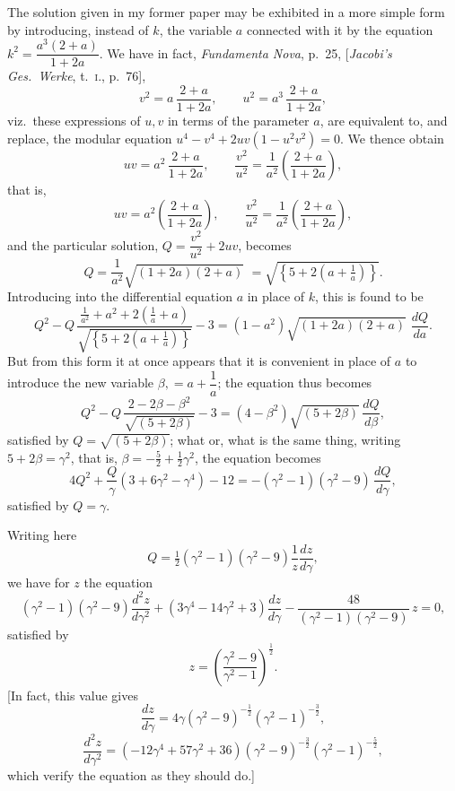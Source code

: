 \documentclass[11pt]{article}
\begin{document}
\medskip
The solution given in my former paper may be exhibited in a more simple form by
introducing, instead of $k$, the variable $a$ connected with it by the equation
$k^{2}=\dfrac{a^{3}(2+a)}{1+2a}$. We have in fact, \textit{Fundamenta Nova}, p.\ 25, [\textit{Jacobi's Ges.\
Werke}, t.\ \textsc{i}., p.\ 76],
\[
v^{2}=a\,\frac{2+a}{1+2a},\qquad u^{2}=a^{3}\,\frac{2+a}{1+2a},
\]
viz.\ these expressions of $u,v$ in terms of the parameter $a$, are equivalent to, and
replace, the modular equation $u^{4}-v^{4}+2uv(1-u^{2}v^{2})=0$. We thence obtain
\[
uv=a^{2}\,\frac{2+a}{1+2a},\qquad \frac{v^{2}}{u^{2}}=\frac{1}{a^{2}}\!\left(\frac{2+a}{1+2a}\right),
\]
that is,
\[
uv=a^{2}\!\left(\frac{2+a}{1+2a}\right),\qquad \frac{v^{2}}{u^{2}}=\frac{1}{a^{2}}\!\left(\frac{2+a}{1+2a}\right),
\]
and the particular solution, $Q=\dfrac{v^{2}}{u^{2}}+2uv$, becomes
\[
Q=\frac{1}{a^{2}}\sqrt{(1+2a)(2+a)}\,\,=\sqrt{\!\left\{5+2\!\left(a+\tfrac{1}{a}\right)\right\}}.
\]
Introducing into the differential equation $a$ in place of $k$, this is found to be
\[
Q^{2}-Q\,\frac{\tfrac{1}{a^{2}}+a^{2}+2\!\left(\tfrac{1}{a}+a\right)}{\sqrt{\!\left\{5+2\!\left(a+\tfrac{1}{a}\right)\right\}}}-3=(1-a^{2})\sqrt{(1+2a)(2+a)}\,\,\frac{dQ}{da}.
\]
But from this form it at once appears that it is convenient in place of $a$ to introduce
the new variable $\beta,=a+\dfrac{1}{a}$; the equation thus becomes
\[
Q^{2}-Q\,\frac{2-2\beta-\beta^{2}}{\sqrt{(5+2\beta)}}-3=(4-\beta^{2})\sqrt{(5+2\beta)}\,\frac{dQ}{d\beta},
\]
satisfied by $Q=\sqrt{(5+2\beta)}$; what or, what is the same thing, writing
$5+2\beta=\gamma^{2}$, that is, $\beta=-\tfrac{5}{2}+\tfrac{1}{2}\gamma^{2}$, the equation becomes
\[
4Q^{2}+\frac{Q}{\gamma}(3+6\gamma^{2}-\gamma^{4})-12=-(\gamma^{2}-1)(\gamma^{2}-9)\,\frac{dQ}{d\gamma},
\]
satisfied by $Q=\gamma$.

\medskip
Writing here
\[
Q=\tfrac{1}{2}(\gamma^{2}-1)(\gamma^{2}-9)\frac{1}{z}\frac{dz}{d\gamma},
\]
we have for $z$ the equation
\[
(\gamma^{2}-1)(\gamma^{2}-9)\frac{d^{2}z}{d\gamma^{2}}+(3\gamma^{4}-14\gamma^{2}+3)\frac{dz}{d\gamma}-\frac{48}{(\gamma^{2}-1)(\gamma^{2}-9)}\,z=0,
\]
satisfied by
\[
z=\!\left(\frac{\gamma^{2}-9}{\gamma^{2}-1}\right)^{\frac{1}{2}}.
\]
[In fact, this value gives
\[
\frac{dz}{d\gamma}=4\gamma(\gamma^{2}-9)^{-\frac{1}{2}}(\gamma^{2}-1)^{-\frac{3}{2}},
\]
\[
\frac{d^{2}z}{d\gamma^{2}}=(-12\gamma^{4}+57\gamma^{2}+36)(\gamma^{2}-9)^{-\frac{3}{2}}(\gamma^{2}-1)^{-\frac{5}{2}},
\]
which verify the equation as they should do.]
\end{document}
